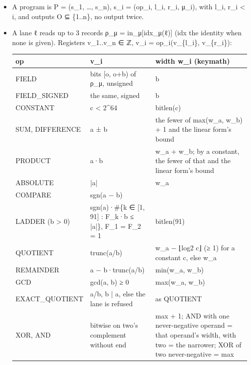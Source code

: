 \begin{itemize}
\item A program is P = (s\_\allowbreak{}1, …, s\_\allowbreak{}n), s\_\allowbreak{}i = (op\_\allowbreak{}i, l\_\allowbreak{}i, r\_\allowbreak{}i, μ\_\allowbreak{}i), with l\_\allowbreak{}i, r\_\allowbreak{}i < i, and outputs O ⊆ \{1..n\}, no output twice.
\item A lane ℓ reads up to 3 records ρ\_\allowbreak{}μ = in\_\allowbreak{}μ[idx\_\allowbreak{}μ(ℓ)] (idx the identity when none is given). Registers v\_\allowbreak{}1..v\_\allowbreak{}n ∈ ℤ, v\_\allowbreak{}i = op\_\allowbreak{}i(v\_\allowbreak{}\{l\_\allowbreak{}i\}, v\_\allowbreak{}\{r\_\allowbreak{}i\}):

{\small
\setlength{\tabcolsep}{6pt}
\begin{longtable}{>{\RaggedRight\arraybackslash}p{}>{\RaggedRight\arraybackslash}p{}>{\RaggedRight\arraybackslash}p{}}
\toprule
op & v\_\allowbreak{}i & width w\_\allowbreak{}i (keymath) \\
\midrule
\endhead
FIELD & bits [o, o+b) of ρ\_\allowbreak{}μ, unsigned & b \\
FIELD\_\allowbreak{}SIGNED & the same, signed & b \\
CONSTANT & c < 2\textasciicircum{}64 & bitlen(c) \\
SUM, DIFFERENCE & a ± b & the fewer of max(w\_\allowbreak{}a, w\_\allowbreak{}b) + 1 and the linear form's bound \\
PRODUCT & a·b & w\_\allowbreak{}a + w\_\allowbreak{}b; by a constant, the fewer of that and the linear form's bound \\
ABSOLUTE & |a| & w\_\allowbreak{}a \\
COMPARE & sgn(a − b) & 1 \\
LADDER (b > 0) & sgn(a)·\#\{k ∈ [1, 91] : F\_\allowbreak{}k·b ≤ |a|\}, F\_\allowbreak{}1 = F\_\allowbreak{}2 = 1 & bitlen(91) \\
QUOTIENT & trunc(a/b) & w\_\allowbreak{}a − ⌊log2 c⌋ (≥ 1) for a constant c, else w\_\allowbreak{}a \\
REMAINDER & a − b·trunc(a/b) & min(w\_\allowbreak{}a, w\_\allowbreak{}b) \\
GCD & gcd(a, b) ≥ 0 & max(w\_\allowbreak{}a, w\_\allowbreak{}b) \\
EXACT\_\allowbreak{}QUOTIENT & a/b, b | a, else the lane is refused & as QUOTIENT \\
XOR, AND & bitwise on two's complement without end & max + 1; AND with one never-negative operand = that operand's width, with two = the narrower; XOR of two never-negative = max \\

\end{longtable}}
\end{itemize}
